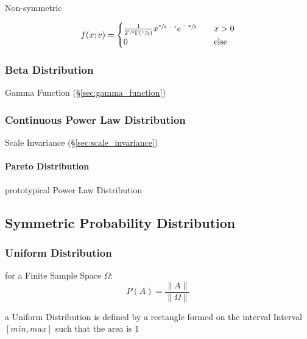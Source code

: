 Non-symmetric

\[
  f(x; v) =
  \begin{cases}
    \frac{1}{2^{\sfrac{v}{2}}\Gamma(\sfrac{v}{2})}
      x^{\sfrac{v}{2-1}} e^{\sfrac{-x}{2}}
          & \quad x > 0 \\
    0     & \quad\text{else} \\
  \end{cases}
\]



\subsubsection{Beta Distribution}\label{sec:beta_distribution}

Gamma Function (\S\ref{sec:gamma_function})



\subsubsection{Continuous Power Law Distribution}
\label{sec:continuous_power_law_distribution}

Scale Invariance (\S\ref{sec:scale_invariance})



\paragraph{Pareto Distribution}\label{sec:pareto_distribution}\hfill

prototypical Power Law Distribution



\subsection{Symmetric Probability Distribution}
\label{sec:symmetric_probability}

\subsubsection{Uniform Distribution}\label{sec:uniform_distribution}

for a Finite Sample Space $\Omega$:
\[
  P(A) = \frac{\|A\|}{\|\Omega\|}
\]

a Uniform Distribution is defined by a rectangle formed on the interval Interval
$[min,max]$ such that the area is $1$

